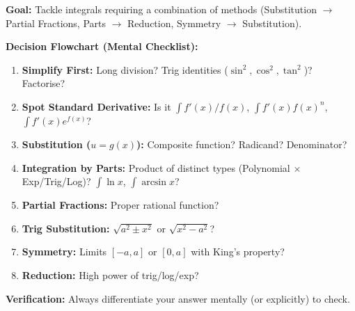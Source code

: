 \documentclass[11pt]{article}
\begin{document}
\begin{methode}
\textbf{Goal:} Tackle integrals requiring a combination of methods (Substitution $\to$ Partial Fractions, Parts $\to$ Reduction, Symmetry $\to$ Substitution).
\par\noindent\textbf{Decision Flowchart (Mental Checklist):}
\begin{enumerate}
    \item \textbf{Simplify First:} Long division? Trig identities ($\sin^2,\cos^2,\tan^2$)? Factorise?
    \item \textbf{Spot Standard Derivative:} Is it $\int f'(x)/f(x)$, $\int f'(x)f(x)^n$, $\int f'(x)e^{f(x)}$?
    \item \textbf{Substitution ($u=g(x)$):} Composite function? Radicand? Denominator?
    \item \textbf{Integration by Parts:} Product of distinct types (Polynomial $\times$ Exp/Trig/Log)? $\int \ln x$, $\int \arcsin x$?
    \item \textbf{Partial Fractions:} Proper rational function?
    \item \textbf{Trig Substitution:} $\sqrt{a^2\pm x^2}$ or $\sqrt{x^2-a^2}$?
    \item \textbf{Symmetry:} Limits $[-a,a]$ or $[0,a]$ with King's property?
    \item \textbf{Reduction:} High power of trig/log/exp?
\end{enumerate}
\textbf{Verification:} Always differentiate your answer mentally (or explicitly) to check.
\end{methode}
\end{document}

